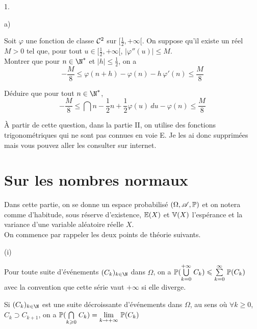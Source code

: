 \documentclass[11pt]{article}%
\begin{document}
\newpage

\begin{noliste}{1.}
\setlength{\itemsep}{2mm}
\setcounter{enumi}{5}
\item
\begin{noliste}{a)}
\item Soit $\varphi$ une fonction de classe ${\cal C}^2$ sur $[\frac 12 
, +\infty [$. On suppose qu'il existe un réel $M>0$ tel que, pour 
tout $u\in [\frac 12, +\infty [$, $\vert \varphi ''(u) \vert \leq M$. \\
Montrer que pour $n\in\N^*$ et $\vert h \vert \leq \frac{1}{2}$, on a 
\[
-\dfrac{M}{8}\leq \varphi (n+h)-\varphi (n)-h \, \varphi'(n)\leq
\dfrac{M}{8}
\]

\item Déduire que pour tout $n\in\N^*$, 
\[
-\dfrac{M}{8}\leq \dint{n-\frac{1}{2}}{n+\frac{1}{2}}\varphi (u)\ 
du-\varphi (n)\leq \dfrac{M}{8}
\]

\item À partir de cette question, dans la partie II, on utilise des 
fonctions trigonométriques qui ne sont pas connues en voie 
E. Je les ai donc supprimées mais vous pouvez aller les consulter sur 
internet.
\end{noliste}
\end{noliste}

\section{Sur les nombres normaux}

\noindent
Dans cette partie, on se donne un espace probabilisé $(\Omega, \mathscr{A}, 
\mathbb{P})$ et on notera comme d'habitude, sous réserve d'existence, 
$\mathbb{E}(X)$ et $\mathbb{V}(X)$ l'espérance et la variance d'une variable aléatoire 
réelle $X$. \\
On commence par rappeler les deux points de théorie suivants.
\begin{nonoliste}{(i)}
\item Pour toute suite d'événements $(C_k)_{k\in\N}$ dans $\Omega$, 
on a $\mathbb{P}({\textstyle\bigcup\limits_{k=0}^{+\infty }}\hspace{.1cm}C_k) \leqslant {\textstyle\sum\limits_{k=0}^{\infty}}\hspace{.1cm}\mathbb{P}(C_k)$ 
avec la convention que cette série vaut $+\infty$ si elle diverge.

\item Si $(C_k)_{k\in\N}$ est une suite décroissante d'événements 
dans $\Omega$, au sens où $\forall k\geq 0$, $C_k\supset C_{k+1}$, on 
a $\mathbb{P}({\textstyle\bigcap\limits_{k\geqslant 0}^{}}\hspace{.1cm}C_k)={\displaystyle \lim_{k\to+\infty} \ }\mathbb{P}(C_k)$
\end{nonoliste}
\end{document}
